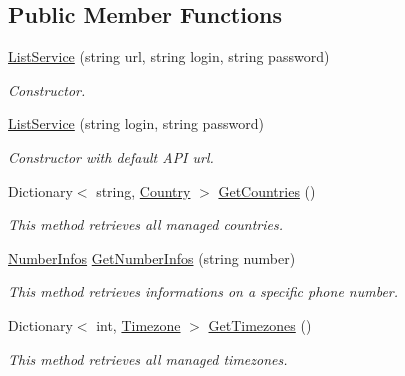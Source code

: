 \subsection*{Public Member Functions}
\begin{DoxyCompactItemize}
\item 
\hyperlink{class_thecallr_api_1_1_services_1_1_client_1_1_list_service_ad82e9bccd16679849ae88018179f5cc7}{List\+Service} (string url, string login, string password)
\begin{DoxyCompactList}\small\item\em Constructor. \end{DoxyCompactList}\item 
\hyperlink{class_thecallr_api_1_1_services_1_1_client_1_1_list_service_a7cdeef937b6742b68f457352f120ac11}{List\+Service} (string login, string password)
\begin{DoxyCompactList}\small\item\em Constructor with default A\+P\+I url. \end{DoxyCompactList}\item 
Dictionary$<$ string, \hyperlink{class_thecallr_api_1_1_objects_1_1_misc_1_1_country}{Country} $>$ \hyperlink{class_thecallr_api_1_1_services_1_1_client_1_1_list_service_a427153b158b323e0adb4dfa7eecd7569}{Get\+Countries} ()
\begin{DoxyCompactList}\small\item\em This method retrieves all managed countries. \end{DoxyCompactList}\item 
\hyperlink{class_thecallr_api_1_1_objects_1_1_misc_1_1_number_infos}{Number\+Infos} \hyperlink{class_thecallr_api_1_1_services_1_1_client_1_1_list_service_a1d50d41a5fb9ab5c70478e400d48b22e}{Get\+Number\+Infos} (string number)
\begin{DoxyCompactList}\small\item\em This method retrieves informations on a specific phone number. \end{DoxyCompactList}\item 
Dictionary$<$ int, \hyperlink{class_thecallr_api_1_1_objects_1_1_misc_1_1_timezone}{Timezone} $>$ \hyperlink{class_thecallr_api_1_1_services_1_1_client_1_1_list_service_accc6e5d0e75b08f41176dbcb42a938b9}{Get\+Timezones} ()
\begin{DoxyCompactList}\small\item\em This method retrieves all managed timezones. \end{DoxyCompactList}\end{DoxyCompactItemize}
